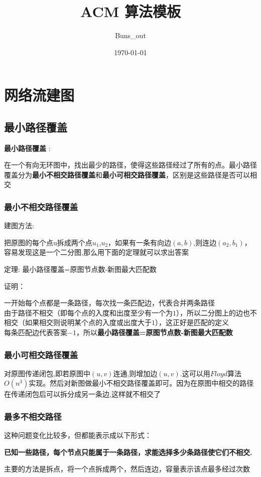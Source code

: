 \documentclass[12pt, a4paper, oneside]{ctexart}
\title{\fontsize{70}{30}\selectfont  ACM 算法模板}
\author{Buns\_out}
\date{\today}
\begin{document}
 



\newpage
\section{ 网络流建图 } 
\subsection{ 最小路径覆盖 } 
\textbf{最小路径覆盖 }: \par
\qquad 在一个有向无环图中，找出最少的路径，使得这些路径经过了所有的点。最小路径覆盖分为\textbf{最小不相交路径覆盖}和\textbf{最小可相交路径覆盖}，区别是这些路径是否可以相交

\subsubsection{ 最小不相交路径覆盖 }
建图方法:\par
\qquad 把原图的每个点u拆成两个点$u_{1}$,$u_{2}$，如果有一条有向边$(a,b)$,则连边$(a_{2},b_{1})$，容易发现这是一个二分图,那么用下面的定理就可以求出答案
\par
定理: 最小路径覆盖=原图节点数-新图最大匹配数
\par
证明：
\par
\qquad 一开始每个点都是一条路径，每次找一条匹配边，代表合并两条路径\\
由于路径不相交（即每个点的入度和出度至少有一个为$1$），所以二分图上的边也不相交（如果相交则说明某个点的入度或出度大于$1$），这正好是匹配的定义\\
每条匹配边代表答案$-1$，所以\textbf{最小路径覆盖=原图节点数-新图最大匹配数}

\subsubsection{最小可相交路径覆盖}
\qquad 对原图传递闭包,即若原图中$(u,v)$连通,则增加边$(u,v)$.这可以用$Floyd$算法$O(n^{3})$实现。然后对新图做最小不相交路径覆盖即可。因为在原图中相交的路径在传递闭包后可以拆分成另一条边,这样就不相交了

\subsubsection{最多不相交路径} 
\qquad  这种问题变化比较多，但都能表示成以下形式：
\par 
\textbf{已知一些路径，每个节点只能属于一条路径，求能选择多少条路径使它们不相交.}
\par
\qquad  主要的方法是拆点，将一个点拆成两个，然后连边，容量表示该点最多经过次数
\end{document}
